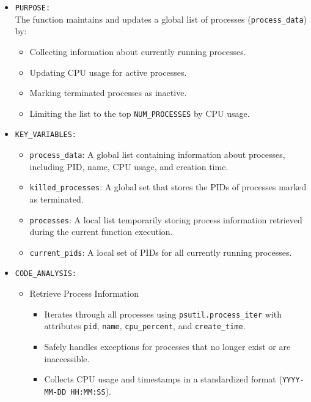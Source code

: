 \documentclass[12pt]{article}
\begin{document}
\begin{itemize}


 \begin{itemize}
    \item \texttt{PURPOSE:}
    \\
       The function maintains and updates a global list of processes (\texttt{process\_data}) by:
\begin{itemize}
    \item Collecting information about currently running processes.
    \item Updating CPU usage for active processes.
    \item Marking terminated processes as inactive.
    \item Limiting the list to the top \texttt{NUM\_PROCESSES} by CPU usage.
\end{itemize}
    
   \item \texttt{KEY\_VARIABLES:}
   \begin{itemize}
    \item \texttt{process\_data}: A global list containing information about processes, including PID, name, CPU usage, and creation time.
    \item \texttt{killed\_processes}: A global set that stores the PIDs of processes marked as terminated.
    \item \texttt{processes}: A local list temporarily storing process information retrieved during the current function execution.
    \item \texttt{current\_pids}: A local set of PIDs for all currently running processes.
\end{itemize}
   \item \texttt{CODE\_ANALYSIS:}
   \begin{itemize}
       \item {Retrieve Process Information}
\begin{itemize}
    \item Iterates through all processes using \texttt{psutil.process\_iter} with attributes \texttt{pid}, \texttt{name}, \texttt{cpu\_percent}, and \texttt{create\_time}.
    \item Safely handles exceptions for processes that no longer exist or are inaccessible.
    \item Collects CPU usage and timestamps in a standardized format (\texttt{YYYY-MM-DD HH:MM:SS}).
\end{itemize}


\end{itemize}
\end{itemize}
\end{itemize}
\end{document}
